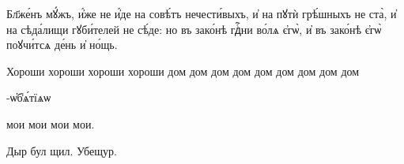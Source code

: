 \documentclass[11pt,a4paper]{memoir}
\newcommand{\chs}[2][slv]{
    \begin{#1}\ignorespaces
        #2
    \ignorespacesafterend\end{#1}
}
\begin{document}
    \begin{slv}
        Бл҃же́нъ мꙋ́жъ, и҆́же не и҆́де на совѣ́тъ нечести́выхъ, и҆ на пꙋтѝ грѣ́шныхъ не ста̀, и҆ на сѣда́лищи гꙋби́телей не сѣ́де: но въ зако́нѣ гдⷭ҇ни во́лѧ є҆гѡ̀, и҆ въ зако́нѣ є҆гѡ̀ поꙋчи́тсѧ де́нь и҆ но́щь.
    \end{slv}

Хороши хороши хороши хороши дом дом дом дом дом дом дом дом дом\chs{-ѡ҆б̾ѧ́тїѧѡ}мои мои мои мои.

    Дыр бул щил. Убещур.
\end{document}
